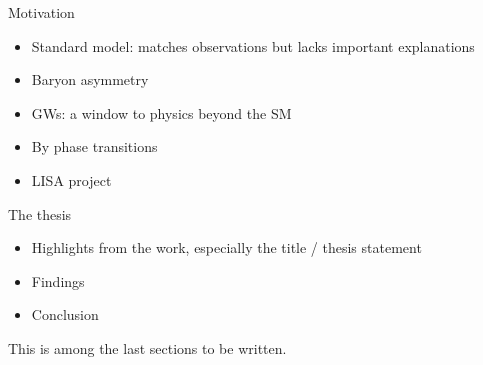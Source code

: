 Motivation
\begin{itemize}
    \item Standard model: matches observations but lacks important explanations
    \item Baryon asymmetry
    \item GWs: a window to physics beyond the SM
    \item By phase transitions
    \item LISA project
\end{itemize}

The thesis
\begin{itemize}
    \item Highlights from the work, especially the title / thesis statement
    \item Findings
    \item Conclusion
\end{itemize}

This is among the last sections to be written.
